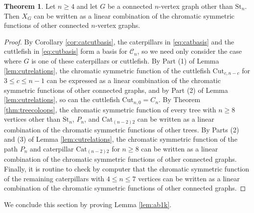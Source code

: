 \documentclass[12pt]{amsart}  %
\theoremstyle{definition}
\newtheorem{theorem}{Theorem}[section]
\theoremstyle{remark}
\numberwithin{equation}{section}
\begin{document}
\begin{theorem}\label{thm:starcoloop}
Let $n\geq 4$ and let $G$ be a connected $n$-vertex graph other than $\text{St}_n$. Then $X_G$ can be written as a linear combination of the chromatic symmetric functions of other connected $n$-vertex graphs.
\end{theorem}

\begin{proof}
By Corollary \ref{cor:catcutbasis}, the caterpillars in \eqref{eq:catbasis} and the cuttlefish in \eqref{eq:cutbasis} form a basis for $\mathcal C_n$, so we need only consider the case where $G$ is one of these caterpillars or cuttlefish. By Part (1) of Lemma \ref{lem:cutrelations}, the chromatic symmetric function of the cuttlefish $\text{Cut}_{c,n-c}$ for $3\leq c\leq n-1$ can be expressed as a linear combination of the chromatic symmetric functions of other connected graphs, and by Part (2) of Lemma \ref{lem:cutrelations}, so can the cuttlefish $\text{Cut}_{n,0}=C_n$. By Theorem \ref{thm:treecoloops}, the chromatic symmetric function of every tree with $n\geq 8$ vertices other than $\text{St}_n$, $P_n$, and $\text{Cat}_{(n-2)2}$ can be written as a linear combination of the chromatic symmetric functions of other trees. By Parts (2) and (3) of Lemma \ref{lem:cutrelations}, the chromatic symmetric function of the path $P_n$ and caterpillar $\text{Cat}_{(n-2)2}$ for $n\geq 8$ can be written as a linear combination of the chromatic symmetric functions of other connected graphs. Finally, it is routine to check by computer that the chromatic symmetric function of the remaining caterpillars with $4\leq n\leq 7$ vertices can be written as a linear combination of the chromatic symmetric functions of other connected graphs.
\end{proof}

We conclude this section by proving Lemma \ref{lem:ab1k}. 

\end{document}
